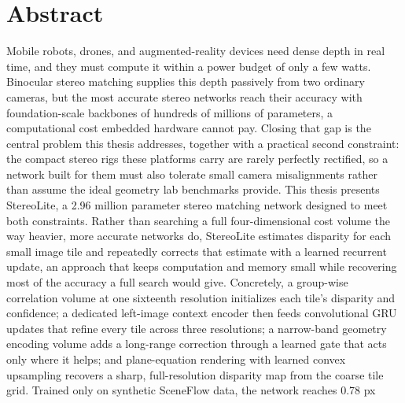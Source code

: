 \chapter*{Abstract}

Mobile robots, drones, and augmented-reality devices need dense depth in
real time, and they must compute it within a power budget of only a few
watts. Binocular stereo matching supplies this depth passively from two
ordinary cameras, but the most accurate stereo networks reach their
accuracy with foundation-scale backbones of hundreds of millions of
parameters, a computational cost embedded hardware cannot pay. Closing
that gap is the central problem this thesis addresses, together with a
practical second constraint: the compact stereo rigs these platforms
carry are rarely perfectly rectified, so a network built for them must
also tolerate small camera misalignments rather than assume the ideal
geometry lab benchmarks provide. This thesis presents StereoLite, a 2.96 million parameter stereo
matching network designed to meet both constraints. Rather than
searching a full four-dimensional cost volume the way heavier, more
accurate networks do, StereoLite estimates disparity for each small
image tile and repeatedly corrects that estimate with a learned
recurrent update, an approach that keeps computation and memory small
while recovering most of the accuracy a full search would give.
Concretely, a group-wise correlation volume at one sixteenth resolution
initializes each tile's disparity and confidence; a dedicated
left-image context encoder then feeds convolutional GRU updates that
refine every tile across three resolutions; a narrow-band geometry
encoding volume adds a long-range correction through a learned gate
that acts only where it helps; and plane-equation rendering with
learned convex upsampling recovers a sharp, full-resolution disparity
map from the coarse tile grid. Trained only on synthetic SceneFlow data, the network reaches 0.78 px
